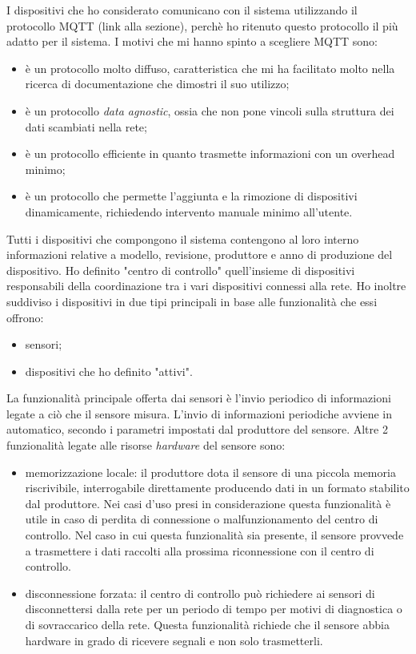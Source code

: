 I dispositivi che ho considerato comunicano con il sistema utilizzando il protocollo MQTT (link alla sezione), perchè ho ritenuto questo protocollo il più adatto per il sistema.
I motivi che mi hanno spinto a scegliere MQTT sono:
\begin{itemize}
	\item è un protocollo molto diffuso, caratteristica che mi ha facilitato molto nella ricerca di documentazione che dimostri il suo utilizzo;
	\item è un protocollo \emph{data agnostic}, ossia che non pone vincoli sulla struttura dei dati scambiati nella rete;
	\item è un protocollo efficiente in quanto trasmette informazioni con un overhead minimo;
	\item è un protocollo che permette l'aggiunta e la rimozione di dispositivi dinamicamente,  richiedendo intervento manuale minimo all'utente.
\end{itemize}

Tutti i dispositivi che compongono il sistema contengono al loro interno informazioni relative a modello, revisione, produttore e anno di produzione del dispositivo.
Ho definito "centro di controllo" quell'insieme di dispositivi responsabili della coordinazione tra i vari dispositivi connessi alla rete.
Ho inoltre suddiviso i dispositivi in due tipi principali in base alle funzionalità che essi offrono:
\begin{itemize}
	\item sensori;
	\item dispositivi che ho definito "attivi".
\end{itemize}
La funzionalità principale offerta dai sensori è l'invio periodico di informazioni legate a ciò che il sensore misura.
L'invio di informazioni periodiche avviene in automatico, secondo i parametri impostati dal produttore del sensore.
Altre 2 funzionalità legate alle risorse \emph{hardware} del sensore sono:
\begin{itemize}
	\item memorizzazione locale: il produttore dota il sensore di una piccola memoria riscrivibile, interrogabile direttamente producendo dati in un formato stabilito dal produttore. Nei casi d'uso presi in considerazione questa funzionalità è utile in caso di perdita di connessione o malfunzionamento del centro di controllo. Nel caso in cui questa funzionalità sia presente, il sensore provvede a trasmettere i dati raccolti alla prossima riconnessione con il centro di controllo.
	\item disconnessione forzata: il centro di controllo può richiedere ai sensori di disconnettersi dalla rete per un periodo di tempo per motivi di diagnostica o di sovraccarico della rete. Questa funzionalità richiede che il sensore abbia hardware in grado di ricevere segnali e non solo trasmetterli.
\end{itemize}

